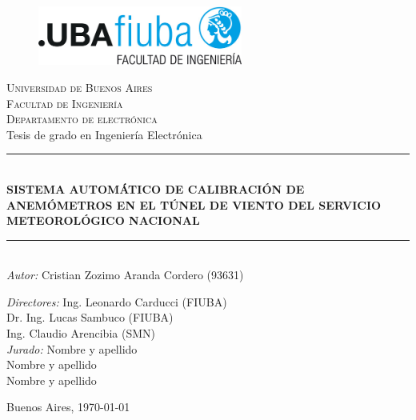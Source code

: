 \begin{titlepage}
\newcommand{\HRule}{\rule{\linewidth}{0.5mm}} 
\center 
\begin{figure}[H]
\centering
\includegraphics[width=0.6\textwidth]{fiuba_logo.jpg}
\end{figure}
\textsc{\large Universidad de Buenos Aires}\\[0.1cm] 
\textsc{\large Facultad de Ingeniería}\\[0.1cm]
\textsc{\large Departamento de electrónica}\\[1cm]

{\LARGE Tesis de grado en Ingeniería Electrónica} \\[0.1cm]

\HRule \\[0.1cm]
{\LARGE \bfseries SISTEMA AUTOMÁTICO DE CALIBRACIÓN DE ANEMÓMETROS EN EL TÚNEL DE VIENTO DEL SERVICIO METEOROLÓGICO NACIONAL}\\
\HRule \\[0.1cm]

\Large \emph{Autor:} \Large Cristian Zozimo Aranda Cordero (93631) \\[0.1cm]
\begin{flushleft}
\Large \emph{Directores:} \hspace{0.5em} \Large Ing. Leonardo Carducci (FIUBA) \\[0.1cm]
\hspace{6em}\Large  Dr. Ing. Lucas Sambuco (FIUBA) \\
\hspace{6em}\Large  Ing. Claudio Arencibia (SMN)\\[0.5cm]
\Large \emph{Jurado:} \hspace{0.5em} \Large  Nombre y apellido \\
\hspace{4.5em}\Large  Nombre y apellido\\
\hspace{4.5em}\Large  Nombre y apellido\\[1cm] 
\end{flushleft}
\large  Buenos Aires, \today
\vfill 
\end{titlepage}
